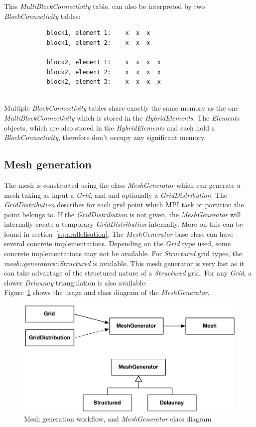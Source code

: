 This \emph{MultiBlockConnectivity} table, can also be interpreted by two \emph{BlockConnectivity} tables:\\[10pt]
\begin{minipage}{\textwidth}
\begin{verbatim}
            block1, element 1:    x  x  x
            block1, element 2:    x  x  x
                                 
            block2, element 1:    x  x  x  x
            block2, element 2:    x  x  x  x
            block2, element 3:    x  x  x  x
\end{verbatim}
\end{minipage}\\[10pt]
Multiple \emph{BlockConnectivity} tables share exactly the same memory as the
one \emph{MultiBlockConnectivity} which is stored in the \emph{HybridElements}.
The \emph{Elements} objects, which are also stored in the \emph{HybridElements}
and each hold a \emph{BlockConnectivity}, therefore don't occupy any 
significant memory.

\subsection{Mesh generation}
%
The mesh is constructed using the class \emph{MeshGenerator} which can generate
a mesh taking as input a \emph{Grid}, and and optionally a
\emph{GridDistribution}. The \emph{GridDistribution} describes for each grid
point which MPI task or partition the point belongs to. If the
\emph{GridDistribution} is not given, the \emph{MeshGenerator} will internally
create a temporary \emph{GridDistribution} internally. More on this can be
found in section~\ref{s:parallelisation}.
The \emph{MeshGenerator} base class can have several concrete implementations.
Depending on the \emph{Grid} type used, some concrete implementations may not
be available. For \emph{Structured} grid types, the
\emph{mesh::generators::Structured} is available. This mesh generator is very
fast as it can take advantage of the structured nature of a \emph{Structured}
grid. For any \emph{Grid}, a slower \emph{Delaunay} triangulation is also
available.\\
%
Figure~\ref{fig:meshgen} shows the usage and class diagram of the
\emph{MeshGenerator}.
%
\begin{figure}
\centering
\includegraphics[scale=0.5]{imgs/meshgenerator.pdf}
\caption{Mesh generation workflow, and \emph{MeshGenerator} class diagram
\label{fig:meshgen}}
\end{figure}


